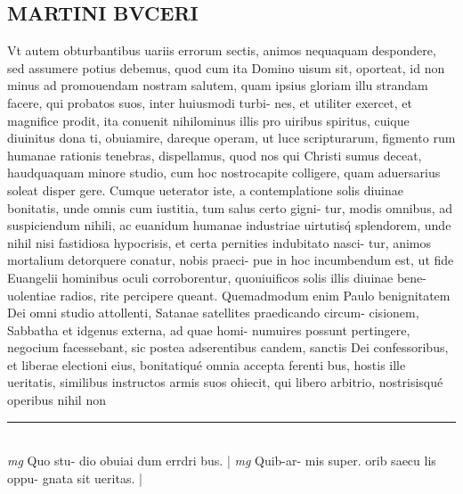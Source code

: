 \documentclass{article}
\begin{document}
\begin{pages}
\section*{MARTINI BVCERI }\pstart Vt autem obturbantibus   uariis errorum sectis, animos nequaquam despondere, sed assumere potius debemus, quod cum ita Domino uisum sit, oporteat, id non minus ad promouendam nostram salutem, quam ipsius gloriam illu strandam facere, qui probatos suos, inter huiusmodi turbi- nes, et utiliter exercet, et magnifice prodit, ita conuenit nihilominus illis pro uiribus spiritus, cuique diuinitus dona ti, obuiamire, dareque operam, ut luce scripturarum, figmento rum humanae rationis tenebras, dispellamus, quod nos qui Christi sumus deceat, haudquaquam minore studio, cum hoc nostrocapite colligere, quam aduersarius soleat disper gere. Cumque ueterator iste, a contemplatione solis diuinae bonitatis, unde omnis cum iustitia, tum salus certo gigni- tur, modis omnibus, ad suspiciendum nihili, ac euanidum humanae industriae uirtutisq́ splendorem, unde nihil nisi fastidiosa hypocrisis, et certa pernities indubitato nasci- tur, animos mortalium detorquere conatur, nobis praeci- pue in hoc incumbendum est, ut fide Euangelii hominibus oculi corroborentur, quouiuificos solis illis diuinae bene- uolentiae radios, rite percipere queant.  \pend\pstart Quemadmodum enim Paulo benignitatem Dei omni studio attollenti, Satanae satellites praedicando circum- cisionem, Sabbatha et idgenus externa, ad quae homi- numuires possunt pertingere, negocium facessebant, sic postea adserentibus candem, sanctis Dei confessoribus, et liberae electioni eius, bonitatiqué omnia accepta ferenti bus, hostis ille ueritatis, similibus instructos armis suos ohiecit, qui libero arbitrio, nostrisisqué operibus nihil non  \pend
\vspace{0.5cm}\noindent
\vspace{0.2cm}\rule{1cm}{0.2pt}\\ 
\hspace{0.2cm}\textit{mg}
\footnotesize Quo stu- dio obuiai dum errdri bus. 
\normalsize| 
\hspace{0.2cm}\textit{mg}
\footnotesize Quib-ar- mis super. orib saecu lis oppu- gnata sit ueritas. 
\normalsize| 

\end{pages}
\end{document}
